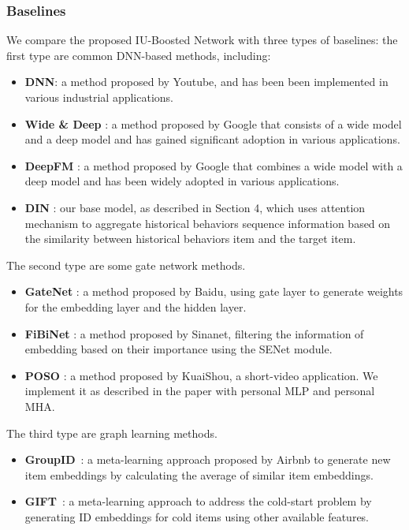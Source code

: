 \subsubsection{\textbf{Baselines}}
We compare the proposed IU-Boosted Network with three types of baselines: the first type are common DNN-based methods, including:
\begin{itemize}
    \item \textbf{DNN}: a method proposed by Youtube, and has been been implemented in various industrial applications.
    \item \textbf{Wide \& Deep} \cite{wideanddeep}:  a method proposed by Google that consists of a wide model and a deep model and has gained significant adoption in various applications.
    \item \textbf{DeepFM} \cite{deepfm}: a method proposed by Google that combines a wide model with a deep model and has been widely adopted in various applications.
    \item \textbf{DIN} \cite{din}: our base model, as described in Section 4, which uses attention mechanism to  aggregate historical behaviors sequence information based on the similarity between historical behaviors item and the target item.
\end{itemize}
The second type are some gate network methods.
\begin{itemize}
    \item \textbf{GateNet} \cite{gatenet}: a method proposed by Baidu, using gate layer to generate weights for the embedding layer and the hidden layer.
    \item \textbf{FiBiNet} \cite{senet}: a method proposed by Sinanet, filtering the information of embedding based on their importance using the SENet module.
    \item \textbf{POSO} \cite{poso}: a method proposed by KuaiShou, a short-video application. We implement it as described in the paper with personal MLP and personal MHA.
\end{itemize}
The third type are graph learning methods.
\begin{itemize}
    \item \textbf{GroupID}~\cite{groupid}: a meta-learning approach proposed by Airbnb to generate new item embeddings by calculating the average of similar item embeddings. 
    \item \textbf{GIFT}~\cite{meta_emb}: a meta-learning approach to address the cold-start problem by generating ID embeddings for cold items using other available features.
\end{itemize}




